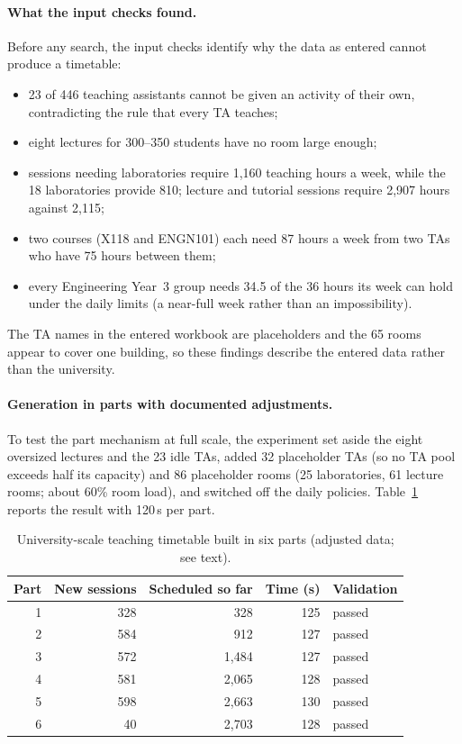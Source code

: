 \paragraph{What the input checks found.} Before any search, the input checks identify why the data as entered cannot produce a timetable:
\begin{itemize}
\tightlist
\item 23 of 446 teaching assistants cannot be given an activity of their own, contradicting the rule that every TA teaches;
\item eight lectures for 300--350 students have no room large enough;
\item sessions needing laboratories require 1{,}160 teaching hours a week, while the 18 laboratories provide 810; lecture and tutorial sessions require 2{,}907 hours against 2{,}115;
\item two courses (X118 and ENGN101) each need 87 hours a week from two TAs who have 75 hours between them;
\item every Engineering Year~3 group needs 34.5 of the 36 hours its week can hold under the daily limits (a near-full week rather than an impossibility).
\end{itemize}
The TA names in the entered workbook are placeholders and the 65 rooms appear to cover one building, so these findings describe the entered data rather than the university.

\paragraph{Generation in parts with documented adjustments.} To test the part mechanism at full scale, the experiment set aside the eight oversized lectures and the 23 idle TAs, added 32 placeholder TAs (so no TA pool exceeds half its capacity) and 86 placeholder rooms (25 laboratories, 61 lecture rooms; about 60\% room load), and switched off the daily policies. Table~\ref{tab:parts} reports the result with 120\,s per part.

\begin{table}[h]
\centering
\small
\begin{tabular}{@{}rrrrl@{}}
\toprule
Part & New sessions & Scheduled so far & Time (s) & Validation \\
\midrule
1 & 328 & 328 & 125 & passed \\
2 & 584 & 912 & 127 & passed \\
3 & 572 & 1{,}484 & 127 & passed \\
4 & 581 & 2{,}065 & 128 & passed \\
5 & 598 & 2{,}663 & 130 & passed \\
6 & 40 & 2{,}703 & 128 & passed \\
\bottomrule
\end{tabular}
\caption{University-scale teaching timetable built in six parts (adjusted data; see text).}
\label{tab:parts}
\end{table}

